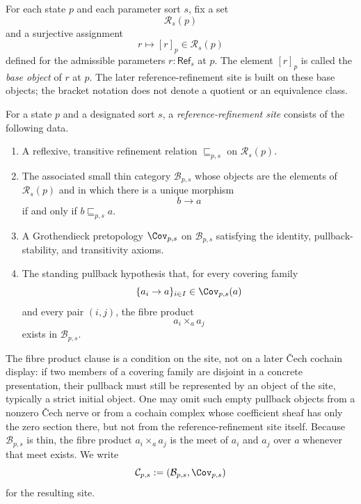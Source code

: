 \begin{definition}\label{def:reference-classes}
For each state $p$ and each parameter sort $s$, fix a set
\[
\mathcal R_s(p)
\]
and a surjective assignment
\[
r\longmapsto [r]_p\in \mathcal R_s(p)
\]
defined for the admissible parameters $r:\mathsf{Ref}_s$ at $p$. The element $[r]_p$ is called the \emph{base object} of $r$ at $p$. The later reference-refinement site is built on these base objects; the bracket notation does not denote a quotient or an equivalence class.
\end{definition}

\begin{definition}\label{def:local-reference-frame}
For a state $p$ and a designated sort $s$, a \emph{reference-refinement site} consists of the following data.
\begin{enumerate}[label=(\roman*),nosep]
\item A reflexive, transitive refinement relation $\sqsubseteq_{p,s}$ on $\mathcal R_s(p)$.
\item The associated small thin category $\mathcal B_{p,s}$ whose objects are the elements of $\mathcal R_s(p)$ and in which there is a unique morphism
\[
b\longrightarrow a
\]
if and only if $b\sqsubseteq_{p,s} a$.
\item A Grothendieck pretopology $\Cov_{p,s}$ on $\mathcal B_{p,s}$ satisfying the identity, pullback-stability, and transitivity axioms.
\item The standing pullback hypothesis that, for every covering family
\[
\{a_i\to a\}_{i\in I}\in \Cov_{p,s}(a)
\]
and every pair $(i,j)$, the fibre product
\[
a_i\times_a a_j
\]
exists in $\mathcal B_{p,s}$.
\end{enumerate}
The fibre product clause is a condition on the site, not on a later
\v{C}ech cochain display: if two members of a covering family are
disjoint in a concrete presentation, their pullback must still be
represented by an object of the site, typically a strict initial object.
One may omit such empty pullback objects from a nonzero \v{C}ech nerve or
from a cochain complex whose coefficient sheaf has only the zero section
there, but not from the reference-refinement site itself. Because
$\mathcal B_{p,s}$ is thin, the fibre product $a_i\times_a a_j$ is the
meet of $a_i$ and $a_j$ over $a$ whenever that meet exists. We write
\[
\mathcal C_{p,s}:=(\mathcal B_{p,s},\Cov_{p,s})
\]
for the resulting site.
\end{definition}

